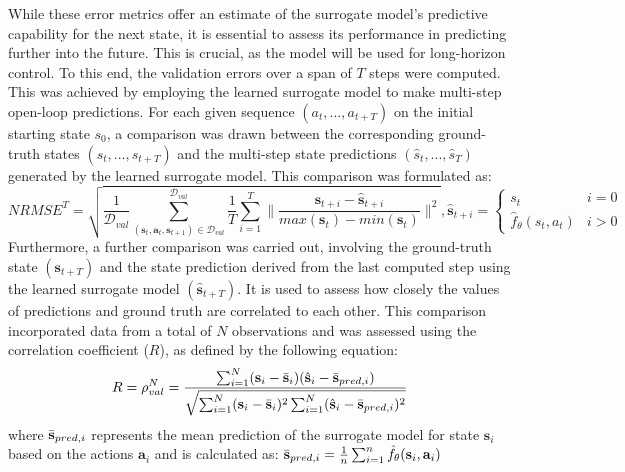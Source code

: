 While these error metrics offer an estimate of the surrogate model's predictive capability for the next state, it is essential to assess its performance in predicting further into the future. This is crucial, as the model will be used for long-horizon control. To this end, the validation errors over a span of $T$ steps were computed. This was achieved by employing the learned surrogate model to make multi-step open-loop predictions. For each given sequence $(a_t, ..., a_{t+T})$ on the initial starting state $s_0$, a comparison was drawn between the corresponding ground-truth states $(s_t, ..., s_{t+T})$ and the multi-step state predictions $(\hat{s}_t, ..., \hat{s}_T)$ generated by the learned surrogate model. This comparison was formulated as:
\begin{equation}
    NRMSE^{T} = \sqrt{\frac{1}{\mathcal{D}_{val}}\sum_{(\mathbf{s}_t,\mathbf{a}_t, \mathbf{s}_{t+1}) \in \mathcal{D}_{val}}^{\mathcal{D}_{val}}\frac{1}{T}\sum_{i=1}^{T}\lVert \frac{\mathbf{s}_{t+i}-\hat{\mathbf{s}}_{t+i}}{max(\mathbf{s}_t) - min(\mathbf{s}_t)}\rVert^2}, 
    \hat{\mathbf{s}}_{t+i} = \begin{cases} 
                        s_t & i=0 \\
                        \hat{f}_\theta(s_t, a_t) & i>0
                    \end{cases}
    \label{eq:NRMSET}
\end{equation}
Furthermore, a further comparison was carried out, involving the ground-truth state $(\mathbf{s}_{t+T})$ and the state prediction derived from the last computed step using the learned surrogate model $(\hat{\mathbf{s}}_{t+T})$. It is used to assess how closely the values of predictions and ground truth are correlated to each other. This comparison incorporated data from a total of $N$ observations and was assessed using the correlation coefficient ($R$), as defined by the following equation:
\begin{equation}
    R=\rho_{val}^{N} = \frac{\sum_{i=1}^{N}(\mathbf{s}_i - \Bar{\mathbf{s}}_i)(\hat{\mathbf{s}}_i-\Bar{\mathbf{s}}_{pred,i})}{\sqrt{\sum_{i=1}^{N}(\mathbf{s}_i - \Bar{\mathbf{s}}_i)^2 \sum_{i=1}^{N}(\hat{\mathbf{s}}_i-\Bar{\mathbf{s}}_{pred,i})^2}}
    \label{eq:R}
\end{equation}
where $\Bar{\mathbf{s}}_{pred,i}$ represents the mean prediction of the surrogate model for state $\mathbf{s}_i$ based on the actions $\mathbf{a}_i$ and is calculated as: $\Bar{\mathbf{s}}_{pred,i} = \frac{1}{n}\sum_{i=1}^{n}\hat{f}_\theta(\mathbf{s}_i, \mathbf{a}_i)$ 

